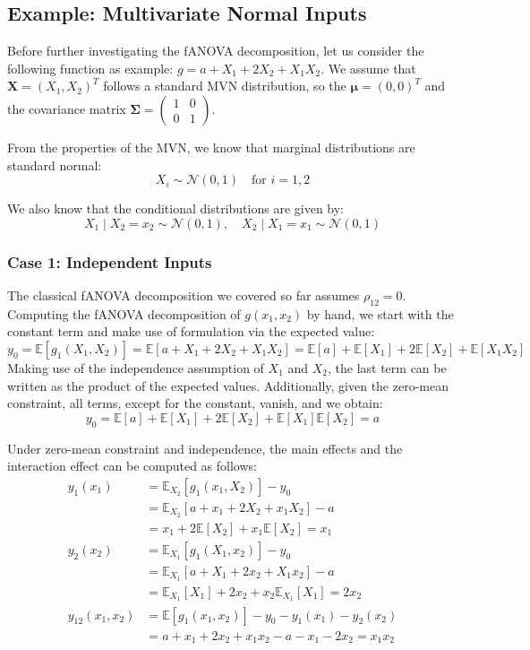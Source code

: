 \subsection{Example: Multivariate Normal Inputs}

Before further investigating the fANOVA decomposition, let us consider the following function as example: \(g = a + X_1 + 2X_2 + X_1 X_2\). We assume that $\boldsymbol{X} = (X_1, X_2)^T$ follows a standard MVN distribution, so the $\boldsymbol{\mu} = (0, 0)^T$ and the covariance matrix $\boldsymbol{\Sigma} = \begin{pmatrix} 1 & 0 \\ 0 & 1 \end{pmatrix}$.

From the properties of the MVN, we know that marginal distributions are standard normal:
\[
X_i \sim \mathcal{N}(0, 1) \quad \text{for } i = 1, 2
\]

We also know that the conditional distributions are given by:
\[
X_1 \mid X_2 = x_2 \sim \mathcal{N}(0, 1), \quad
X_2 \mid X_1 = x_1 \sim \mathcal{N}(0, 1)
\]

\subsubsection*{Case 1: Independent Inputs}
The classical fANOVA decomposition we covered so far assumes $\rho_{12} = 0$. Computing the fANOVA decomposition of $g(x_1, x_2)$ by hand, we start with the constant term and make use of formulation via the expected value:
\[
y_0 = \mathbb{E}[g_{1}(X_1, X_2)] = \mathbb{E}[a + X_1 + 2X_2 + X_1X_2] = \mathbb{E}[a] + \mathbb{E}[X_1] + 2\mathbb{E}[X_2] + \mathbb{E}[X_1X_2]
\]
Making use of the independence assumption of $X_1$ and $X_2$, the last term can be written as the product of the expected values. Additionally, given the zero-mean constraint, all terms, except for the constant, vanish, and we obtain:
\[
y_0 = \mathbb{E}[a] + \mathbb{E}[X_1] + 2\mathbb{E}[X_2] + \mathbb{E}[X_1]\mathbb{E}[X_2] = a
\]

Under zero-mean constraint and independence, the main effects and the interaction effect can be computed as follows:
\begin{align*}
y_1(x_1) &= \mathbb{E}_{X_2}[g_{1}(x_1, X_2)] - y_0 \\
&= \mathbb{E}_{X_2}[a + x_1 + 2X_2 + x_1X_2] - a \\
&= x_1 + 2\mathbb{E}[X_2] + x_1\mathbb{E}[X_2] = x_1\\
y_2(x_2) &= \mathbb{E}_{X_1}[g_{1}(X_1, x_2)] - y_0 \\
&= \mathbb{E}_{X_1}[a + X_1 + 2x_2 + X_1x_2] - a \\
&= \mathbb{E}_{X_1}[X_1] + 2x_2 + x_2\mathbb{E}_{X_1}[X_1] = 2x_2\\
y_{12}(x_1, x_2) &= \mathbb{E}[g_{1}(x_1, x_2)] - y_0 - y_1(x_1) - y_2(x_2) \\
&= a + x_1 + 2x_2 + x_1x_2 - a - x_1 - 2x_2 = x_1x_2
\end{align*}

